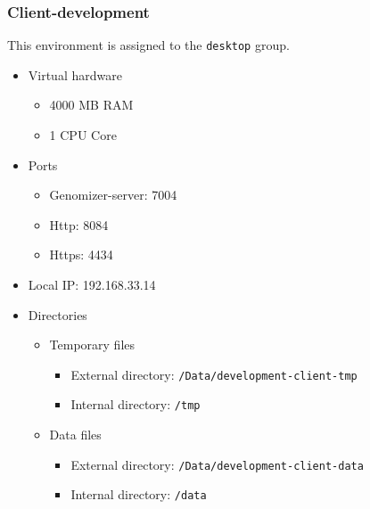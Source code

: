 \subsubsection{Client-development}\label{client-development}

This environment is assigned to the \texttt{desktop} group.

\begin{itemize}
\itemsep1pt\parskip0pt
\item
  Virtual hardware

  \begin{itemize}
  \itemsep1pt\parskip0pt
  \item
    4000 MB RAM
  \item
    1 CPU Core
  \end{itemize}
\item
  Ports

  \begin{itemize}
  \itemsep1pt\parskip0pt
  \item
    Genomizer-server: 7004
  \item
    Http: 8084
  \item
    Https: 4434
  \end{itemize}
\item
  Local IP: 192.168.33.14
\item
  Directories

  \begin{itemize}
  \itemsep1pt\parskip0pt
  \item
    Temporary files

    \begin{itemize}
    \itemsep1pt\parskip0pt
    \item
      External directory: \texttt{/Data/development-client-tmp}
    \item
      Internal directory: \texttt{/tmp}
    \end{itemize}
  \item
    Data files

    \begin{itemize}
    \itemsep1pt\parskip0pt
    \item
      External directory: \texttt{/Data/development-client-data}
    \item
      Internal directory: \texttt{/data}
    \end{itemize}
  \end{itemize}
\end{itemize}

